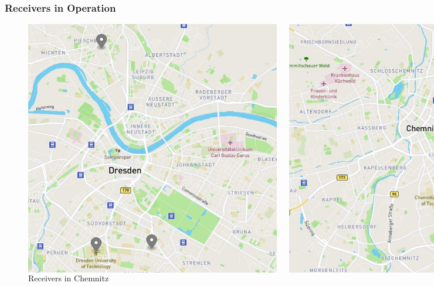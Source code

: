 \begin{frame}
  \frametitle{Receivers in Operation}

\begin{figure}
\begin{columns}
\centering
  \includegraphics[height=0.65\textheight]{figs/map_dresden.jpg}
  \caption{Receivers in Dresden}
\centering
  \includegraphics[height=0.65\textheight]{figs/map_chemnitz.jpg}
  \caption{Receivers in Chemnitz}
\end{columns}
\end{figure}

\end{frame}

